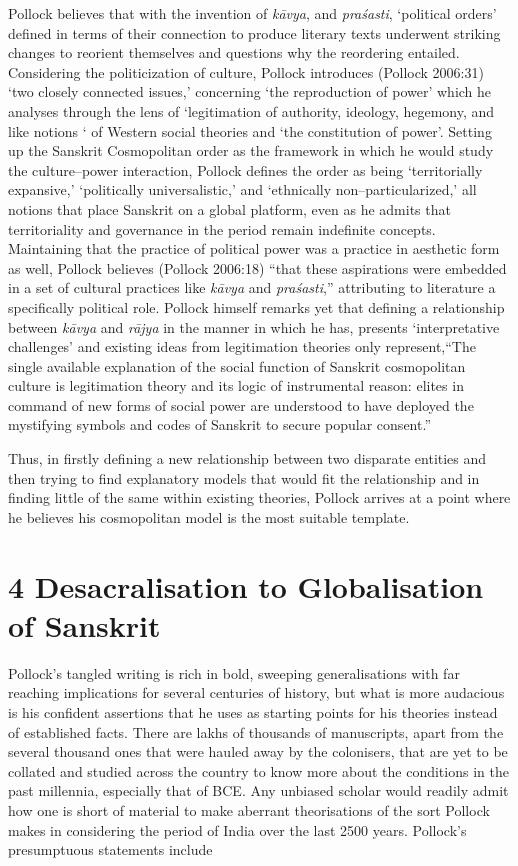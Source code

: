 Pollock believes that with the invention of \textit{kāvya}, and \textit{praśasti}, ‘political orders’ defined in terms of their connection to produce literary texts underwent striking changes to reorient themselves and questions why the reordering entailed. Considering the politicization of culture, Pollock introduces (Pollock 2006:31) ‘two closely connected issues,’ concerning ‘the reproduction of power’ which he analyses through the lens of ‘legitimation of authority, ideology, hegemony, and like notions ‘ of Western social theories and ‘the constitution of power’. Setting up the Sanskrit Cosmopolitan order as the framework in which he would study the culture–power interaction, Pollock defines the order as being ‘territorially expansive,’ ‘politically universalistic,’ and ‘ethnically non–particularized,’ all notions that place Sanskrit on a global platform, even as he admits that territoriality and governance in the period remain indefinite concepts. Maintaining that the practice of political power was a practice in aesthetic form as well, Pollock believes (Pollock 2006:18) “that these aspirations were embedded in a set of cultural practices like \textit{kāvya} and \textit{praśasti},” attributing to literature a specifically political role. Pollock himself remarks yet that defining a relationship between \textit{kāvya} and \textit{rājya} in the manner in which he has, presents ‘interpretative challenges’ and existing ideas from legitimation theories only represent,“The single available explanation of the social function of Sanskrit cosmopolitan culture is legitimation theory and its logic of instrumental reason: elites in command of new forms of social power are understood to have deployed the mystifying symbols and codes of Sanskrit to secure popular consent.”

Thus, in firstly defining a new relationship between two disparate entities and then trying to find explanatory models that would fit the relationship and in finding little of the same within existing theories, Pollock arrives at a point where he believes his cosmopolitan model is the most suitable template.


\section*{4 Desacralisation to Globalisation of Sanskrit}

Pollock’s tangled writing is rich in bold, sweeping generalisations with far reaching implications for several centuries of history, but what is more audacious is his confident assertions that he uses as starting points for his theories instead of established facts. There are lakhs of thousands of manuscripts, apart from the several thousand ones that were hauled away by the colonisers, that are yet to be collated and studied across the country to know more about the conditions in the past millennia, especially that of BCE. Any unbiased scholar would readily admit how one is short of material to make aberrant theorisations of the sort Pollock makes in considering the period of India over the last 2500 years. Pollock’s presumptuous statements include

